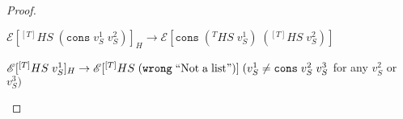 \begin{theorem}
\begin{proof}
\begin{case}
\end{case}
\begin{case}
$\mathscr{E}[^{[T]}HS\;(\mathtt{cons}\;v_{S}^{1}\;v_{S}^{2})]_{H}\rightarrow\mathscr{E}[\mathtt{cons}\;(^{T}HS\;v_{S}^{1})\;(^{[T]}HS\;v_{S}^{2})]$

\end{case}
\begin{case}
$\mathscr{E}[^{[T]}HS\;v_{S}^{1}]_{H}\rightarrow\mathscr{E}[^{[T]}HS\;(\mathtt{wrong}\;\mathrm{``Not\;a\;list"})]\;(v_{S}^{1}\neq\mathtt{cons}\;v_{S}^{2}\;v_{S}^{3}$ for any $v_{S}^{2}$ or $v_{S}^{3})$

\end{case}
\end{proof}
\end{theorem}